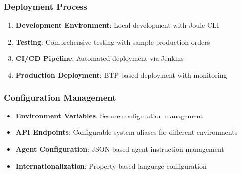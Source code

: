 \subsubsection{Deployment Process}
\begin{enumerate}
    \item \textbf{Development Environment}: Local development with Joule CLI
    \item \textbf{Testing}: Comprehensive testing with sample production orders
    \item \textbf{CI/CD Pipeline}: Automated deployment via Jenkins
    \item \textbf{Production Deployment}: BTP-based deployment with monitoring
\end{enumerate}

\subsubsection{Configuration Management}
\begin{itemize}
    \item \textbf{Environment Variables}: Secure configuration management
    \item \textbf{API Endpoints}: Configurable system aliases for different environments
    \item \textbf{Agent Configuration}: JSON-based agent instruction management
    \item \textbf{Internationalization}: Property-based language configuration
\end{itemize}